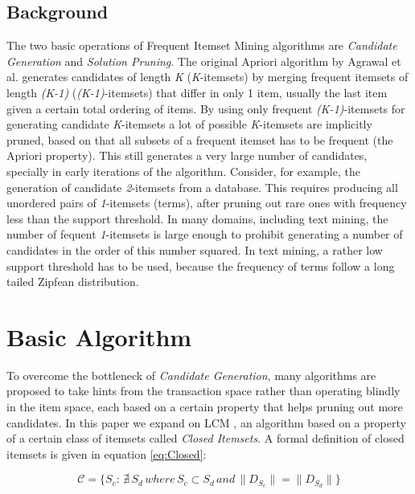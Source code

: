 \documentclass{sig-alternate}
\begin{document}
\subsection{Background}

The two basic operations of Frequent Itemset Mining algorithms are \emph{Candidate Generation} and \emph{Solution Pruning}. The original Apriori algorithm by Agrawal et al. \cite{apriori} generates candidates of length \emph{K} (\emph{K}-itemsets) by merging frequent itemsets of length \emph{(K-1)} (\emph{(K-1)}-itemsets) that differ in only 1 item, usually the last item given a certain total ordering of items. By using only frequent  \emph{(K-1)}-itemsets for generating candidate \emph{K}-itemsets a lot of possible \emph{K}-itemsets are implicitly pruned, based on that all subsets of a frequent itemset has to be frequent (the Apriori property). This still generates a very large number of candidates, specially in early iterations of the algorithm. Consider, for example, the generation of candidate \emph{2}-itemsets from a database. This requires producing all unordered pairs of \emph{1}-itemsets (terms), after pruning out rare ones with frequency less than the support threshold. In many domains, including text mining, the number of fequent \emph{1}-itemsets is large enough to prohibit generating a number of candidates in the order of this number squared. In text mining, a rather low support threshold has to be used, because the frequency of terms follow a long tailed Zipfean distribution.

\section{Basic Algorithm}
To overcome the bottleneck of \emph{Candidate Generation}, many algorithms are proposed to take hints from the transaction space rather than operating blindly in the item space, each based on a certain property that helps pruning out more candidates. In this paper we expand on LCM \cite{lcm}, an algorithm based on a property of a certain class of itemsets called \emph{Closed Itemsets}. A formal definition of closed itemsets is given in equation \ref{eq:Closed}: 

\begin{equation}\label{eq:Closed}\mathcal{C} = \{S_c:\, \nexists \, S_d \, where \, S_c  \subset S_d \, and \, \|D_{S_c}\| = \|D_{S_d}\|\}\end{equation}
\end{document}
